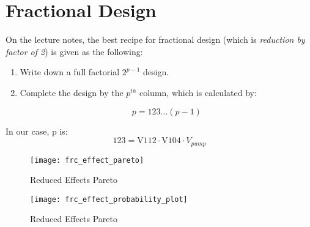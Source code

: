 \newpage
\section{Fractional Design}

On the lecture notes, the best recipe for fractional design (which is \textit{reduction by factor of 2}) is given as the following:
\begin{enumerate}
    \item Write down a full factorial $2^{p-1}$ design.
    \item Complete the design by the $p^{th}$ column, which is calculated by:

    $$
        p = 123...(p-1)
    $$
\end{enumerate}

In our case, p is:
$$123 = \text{V112} \cdot \text{V104} \cdot V_{pump}$$

\begin{figure}[!h]
    \begin{center}
        \texttt{[image: frc\_effect\_pareto]}
    \end{center}
    \caption{Reduced Effects Pareto}
\end{figure}

\begin{figure}[!h]
    \begin{center}
        \texttt{[image: frc\_effect\_probability\_plot]}
    \end{center}
    \caption{Reduced Effects Pareto}
\end{figure}





